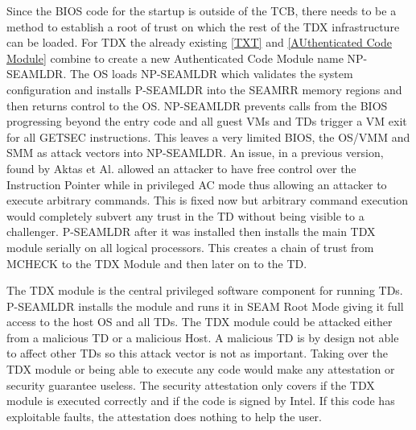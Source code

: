 
Since the BIOS code for the startup is outside of the \gls{TCB}, there needs to be a method to establish a root of trust on which the rest of the TDX infrastructure can be loaded. For TDX the already existing \ref{TXT} and \ref{AUthenticated Code Module} combine to create a new Authenticated Code Module name \Gls{NP-SEAMLDR}. The OS loads \Gls{NP-SEAMLDR} which validates the system configuration and installs \Gls{P-SEAMLDR} into the \Gls{SEAMRR} memory regions and then returns control to the OS. \Gls{NP-SEAMLDR} prevents calls from the BIOS progressing beyond the entry code and all guest VMs and TDs trigger a VM exit for all \Gls{GETSEC} instructions. This leaves a very limited BIOS, the OS/VMM and SMM as attack vectors into \Gls{NP-SEAMLDR}. An issue, in a previous version, found by Aktas et Al. allowed an attacker to have free control over the Instruction Pointer while in privileged AC mode thus allowing an attacker to execute arbitrary commands\cite{aktas_intel_nodate}. This is fixed now but arbitrary command execution would completely subvert any trust in the \Gls{TD} without being visible to a challenger. \Gls{P-SEAMLDR} after it was installed then installs the main TDX module serially on all logical processors. This creates a chain of trust from MCHECK to the TDX Module and then later on to the TD. 


The TDX module is the central privileged software component for running TDs. \Gls{P-SEAMLDR} installs the module and runs it in SEAM Root Mode giving it full access to the host OS and all TDs. The TDX module could be attacked either from a malicious TD or a malicious Host. A malicious TD is by design not able to affect other TDs so this attack vector is not as important. Taking over the TDX module or being able to execute any code would make any attestation or security guarantee useless. The security attestation only covers if the TDX module is executed correctly and if the code is signed by Intel. If this code has exploitable faults, the attestation does nothing to help the user.


